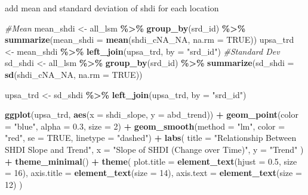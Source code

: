 \documentclass[
]{article}
\newenvironment{Shaded}{\begin{snugshade}}{\end{snugshade}}
\newcommand{\AttributeTok}[1]{\textcolor[rgb]{0.13,0.29,0.53}{#1}}
\newcommand{\CommentTok}[1]{\textcolor[rgb]{0.56,0.35,0.01}{\textit{#1}}}
\newcommand{\ConstantTok}[1]{\textcolor[rgb]{0.56,0.35,0.01}{#1}}
\newcommand{\DecValTok}[1]{\textcolor[rgb]{0.00,0.00,0.81}{#1}}
\newcommand{\FloatTok}[1]{\textcolor[rgb]{0.00,0.00,0.81}{#1}}
\newcommand{\FunctionTok}[1]{\textcolor[rgb]{0.13,0.29,0.53}{\textbf{#1}}}
\newcommand{\NormalTok}[1]{#1}
\newcommand{\OtherTok}[1]{\textcolor[rgb]{0.56,0.35,0.01}{#1}}
\newcommand{\SpecialCharTok}[1]{\textcolor[rgb]{0.81,0.36,0.00}{\textbf{#1}}}
\newcommand{\StringTok}[1]{\textcolor[rgb]{0.31,0.60,0.02}{#1}}
\begin{document}
add mean and standard deviation of shdi for each location

\begin{Shaded}
\begin{Highlighting}[]
\CommentTok{\#Mean}
\NormalTok{mean\_shdi }\OtherTok{\textless{}{-}}\NormalTok{ all\_lsm }\SpecialCharTok{\%\textgreater{}\%}
  \FunctionTok{group\_by}\NormalTok{(srd\_id) }\SpecialCharTok{\%\textgreater{}\%}
  \FunctionTok{summarize}\NormalTok{(}\AttributeTok{mean\_shdi =} \FunctionTok{mean}\NormalTok{(shdi\_cNA\_NA, }\AttributeTok{na.rm =} \ConstantTok{TRUE}\NormalTok{))}
\NormalTok{upsa\_trd }\OtherTok{\textless{}{-}}\NormalTok{ mean\_shdi }\SpecialCharTok{\%\textgreater{}\%}
  \FunctionTok{left\_join}\NormalTok{(upsa\_trd, }\AttributeTok{by =} \StringTok{"srd\_id"}\NormalTok{)}
\CommentTok{\#Standard Dev}
\NormalTok{sd\_shdi }\OtherTok{\textless{}{-}}\NormalTok{ all\_lsm }\SpecialCharTok{\%\textgreater{}\%}
  \FunctionTok{group\_by}\NormalTok{(srd\_id) }\SpecialCharTok{\%\textgreater{}\%}
  \FunctionTok{summarize}\NormalTok{(}\AttributeTok{sd\_shdi =} \FunctionTok{sd}\NormalTok{(shdi\_cNA\_NA, }\AttributeTok{na.rm =} \ConstantTok{TRUE}\NormalTok{))}

\NormalTok{upsa\_trd }\OtherTok{\textless{}{-}}\NormalTok{ sd\_shdi }\SpecialCharTok{\%\textgreater{}\%}
  \FunctionTok{left\_join}\NormalTok{(upsa\_trd, }\AttributeTok{by =} \StringTok{"srd\_id"}\NormalTok{)}
\end{Highlighting}
\end{Shaded}

\begin{Shaded}
\begin{Highlighting}[]
\FunctionTok{ggplot}\NormalTok{(upsa\_trd, }\FunctionTok{aes}\NormalTok{(}\AttributeTok{x =}\NormalTok{ shdi\_slope, }\AttributeTok{y =}\NormalTok{ abd\_trend)) }\SpecialCharTok{+}
  \FunctionTok{geom\_point}\NormalTok{(}\AttributeTok{color =} \StringTok{"blue"}\NormalTok{, }\AttributeTok{alpha =} \FloatTok{0.3}\NormalTok{, }\AttributeTok{size =} \DecValTok{2}\NormalTok{) }\SpecialCharTok{+}  
  \FunctionTok{geom\_smooth}\NormalTok{(}\AttributeTok{method =} \StringTok{"lm"}\NormalTok{, }\AttributeTok{color =} \StringTok{"red"}\NormalTok{, }\AttributeTok{se =} \ConstantTok{TRUE}\NormalTok{, }\AttributeTok{linetype =} \StringTok{"dashed"}\NormalTok{) }\SpecialCharTok{+} 
  \FunctionTok{labs}\NormalTok{(}
    \AttributeTok{title =} \StringTok{"Relationship Between SHDI Slope and Trend"}\NormalTok{,}
    \AttributeTok{x =} \StringTok{"Slope of SHDI (Change over Time)"}\NormalTok{,}
    \AttributeTok{y =} \StringTok{"Trend"}
\NormalTok{  ) }\SpecialCharTok{+}
  \FunctionTok{theme\_minimal}\NormalTok{() }\SpecialCharTok{+}
  \FunctionTok{theme}\NormalTok{(}
    \AttributeTok{plot.title =} \FunctionTok{element\_text}\NormalTok{(}\AttributeTok{hjust =} \FloatTok{0.5}\NormalTok{, }\AttributeTok{size =} \DecValTok{16}\NormalTok{),}
    \AttributeTok{axis.title =} \FunctionTok{element\_text}\NormalTok{(}\AttributeTok{size =} \DecValTok{14}\NormalTok{),}
    \AttributeTok{axis.text =} \FunctionTok{element\_text}\NormalTok{(}\AttributeTok{size =} \DecValTok{12}\NormalTok{)}
\NormalTok{  )}
\end{Highlighting}
\end{Shaded}
\end{document}
